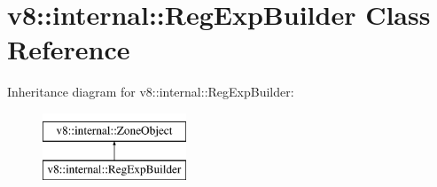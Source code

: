 \hypertarget{classv8_1_1internal_1_1RegExpBuilder}{}\section{v8\+:\+:internal\+:\+:Reg\+Exp\+Builder Class Reference}
\label{classv8_1_1internal_1_1RegExpBuilder}
Inheritance diagram for v8\+:\+:internal\+:\+:Reg\+Exp\+Builder\+:\begin{figure}[H]
\begin{center}
\leavevmode
\includegraphics[height=2.000000cm]{classv8_1_1internal_1_1RegExpBuilder}
\end{center}
\end{figure}
